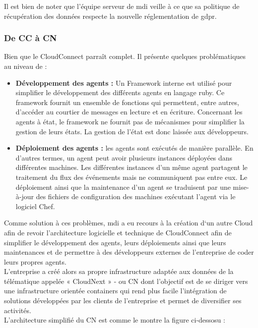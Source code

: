         Il est bien de noter que l'équipe serveur de \gls{mdi} veille à ce que sa politique de récupération des données 
        respecte la nouvelle réglementation de \gls{gdpr}\cite{gdpr}. \\ [0.3cm]
      
    
    \subsubsection{De \gls{CC} à \gls{CN}}

       Bien que le CloudConnect parraît complet. Il présente quelques problématiques au niveau de : 
       \begin{itemize}
        \renewcommand{\labelitemi}{$\bullet$}
            \item \textbf{Développement des agents :} Un Framework interne est utilisé pour simplifier le développement des différents 
        agents en langage ruby. Ce framework fournit un ensemble de fonctions qui permettent, entre autres, d’accéder au 
        courtier de messages en lecture et en écriture. Concernant les agents à état, le framework ne fournit pas 
        de mécanismes pour simplifier la gestion de leurs états. La gestion de l’état est donc laissée aux développeurs.\\[0.3cm]
            \item \textbf{Déploiement des agents :} les agents sont exécutés de manière parallèle. En d’autres termes, un agent peut avoir 
        plusieurs instances déployées dans différentes machines. Les différentes instances d’un même agent partagent 
        le traitement du flux des événements mais ne communiquent pas entre eux. Le déploiement ainsi que la maintenance 
        d’un agent se traduisent par une mise-à-jour des fichiers de configuration des machines exécutant l’agent via le logiciel Chef.\\ [0.3cm]
    \end{itemize}

         Comme solution à ces problèmes, \gls{mdi} a eu recours à la création d‘un autre Cloud afin de revoir l’architecture 
        logicielle et technique de CloudConnect afin de simplifier le développement des agents, leurs déploiements 
        ainsi que leurs maintenances et de permettre à des développeurs externes de l’entreprise de coder leurs propres agents.\\
        L'entreprise a créé alors sa propre infrastructure adaptée aux données de la télématique appelée « CloudNext » - ou  \gls{CN} 
        dont l’objectif est de se diriger vers une infrastructure orientée containers qui rend plus facile l’intégration de 
        solutions développées par les clients de l’entreprise et permet de diversifier ses activités.\\ [0.3cm] 
        L'architecture simplifié du \gls{CN} est comme le montre la figure ci-dessosu : 


